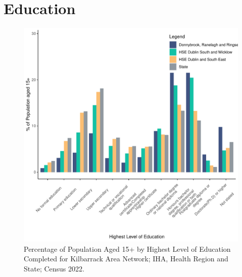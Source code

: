 \documentclass{article}
\begin{document}
\section{Education}\label{sect:Edu}
\begin{figure}[H]
	\centering
	\includegraphics[width = 120mm]{../figures/EduED.pdf}
	\caption{Percentage of Population Aged 15+ by Highest Level of Education Completed for Kilbarrack Area Network; IHA, Health Region and State; Census 2022.}
	\label{fig:vbnv}
	\end{figure}
\end{document}

